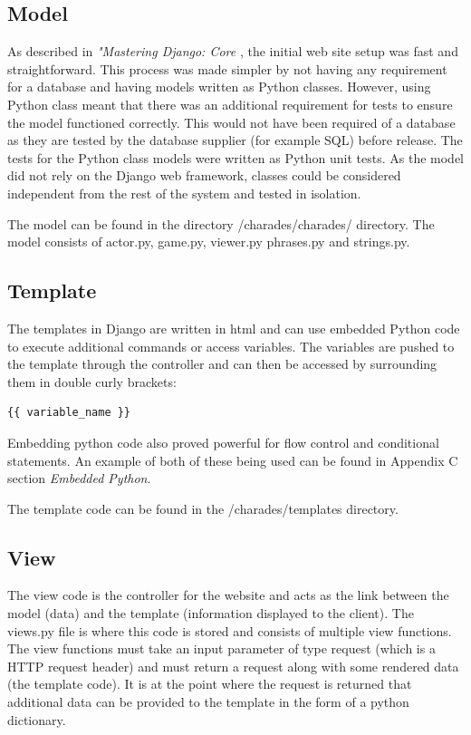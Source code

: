 \subsection{Model}
As described in \textit{"Mastering Django: Core} \cite{django_book}, the initial web site setup was fast and straightforward. This process was made simpler by not having any requirement for a database and having models written as Python classes. However, using Python class meant that there was an additional requirement for tests to ensure the model functioned correctly. This would not have been required of a database as they are tested by the database supplier (for example SQL) before release. The tests for the Python class models were written as Python unit tests. As the model did not rely on the Django web framework, classes could be considered independent from the rest of the system and tested in isolation.

The model can be found in the directory /charades/charades/ directory. The model consists of actor.py, game.py, viewer.py phrases.py and strings.py.

\subsection{Template}
The templates in Django are written in html and can use embedded Python code to execute additional commands or access variables. The variables are pushed to the template through the controller and can then be accessed by surrounding them in double curly brackets:
\begin{verbatim}
{{ variable_name }}
\end{verbatim}

Embedding python code also proved powerful for flow control and conditional statements. An example of both of these being used can be found in Appendix C section \textit{Embedded Python}.

The template code can be found in the /charades/templates directory.

\subsection{View}
The view code is the controller for the website and acts as the link between the model (data) and the template (information displayed to the client). The views.py file is where this code is stored and consists of multiple view functions. The view functions must take an input parameter of type request (which is a HTTP request header) and must return a request along with some rendered data (the template code). It is at the point where the request is returned that additional data can be provided to the template in the form of a python dictionary.

